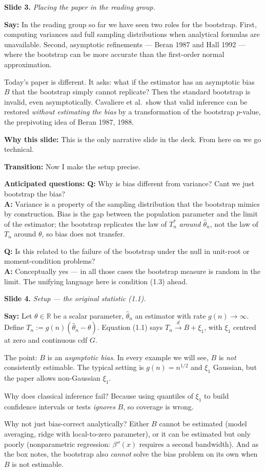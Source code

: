 \documentclass[11pt]{article}
\theoremstyle{definition}
\newcommand{\R}{\mathbb{R}}
\newcommand{\dto}{\xrightarrow{d}}
\newcommand{\Tn}{T_{n}}
\newcommand{\Tns}{T_{n}^{*}}
\newcommand{\thn}{\hat{\theta}_{n}}
\newcommand{\slide}[2]{%
  \medskip
  \noindent\colorbox{soft}{\parbox{\linewidth}{\textbf{Slide #1.} \textit{#2}}}
  \medskip
}
\newcommand{\say}[1]{\textbf{Say:} #1}
\newcommand{\why}[1]{\textbf{Why this slide:} #1}
\newcommand{\trans}[1]{\textbf{Transition:} #1}
\newcommand{\Q}[2]{\noindent\textcolor{warn}{\textbf{Q:}} #1\\ \textcolor{accent}{\textbf{A:}} #2\par\smallskip}
\begin{document}
\slide{3}{Placing the paper in the reading group.}
\say{In the reading group so far we have seen two roles for the bootstrap.
First, computing variances and full sampling distributions when analytical
formulas are unavailable. Second, asymptotic refinements --- Beran 1987 and
Hall 1992 --- where the bootstrap can be more accurate than the first-order
normal approximation.

Today's paper is different. It asks: what if the estimator has an asymptotic
bias $B$ that the bootstrap simply cannot replicate? Then the standard
bootstrap is invalid, even asymptotically. Cavaliere et al.\ show that valid
inference can be restored \emph{without estimating the bias} by a transformation
of the bootstrap $p$-value, the prepivoting idea of Beran 1987, 1988.}

\why{This is the only narrative slide in the deck. From here on we go technical.}

\trans{Now I make the setup precise.}

\textbf{Anticipated questions:}
\Q{Why is bias different from variance? Cant we just bootstrap the bias?}
{Variance is a property of the sampling distribution that the bootstrap
mimics by construction. Bias is the gap between the population parameter and
the limit of the estimator; the bootstrap replicates the law of $\Tns$ \emph{around
$\thn$}, not the law of $\Tn$ around $\theta$, so bias does not transfer.}
\Q{Is this related to the failure of the bootstrap under the null in
unit-root or moment-condition problems?}
{Conceptually yes --- in all those cases the bootstrap measure is random
in the limit. The unifying language here is condition (1.3) ahead.}

\slide{4}{Setup --- the original statistic (1.1).}
\say{Let $\theta\in\R$ be a scalar parameter, $\thn$ an estimator with rate
$g(n)\to\infty$. Define $\Tn:=g(n)(\thn-\theta)$. Equation (1.1) says
$\Tn\dto B+\xi_1$, with $\xi_1$ centred at zero and continuous cdf $G$.

The point: $B$ is an \emph{asymptotic bias}. In every example we will see, $B$
is \emph{not} consistently estimable. The typical setting is $g(n)=n^{1/2}$ and
$\xi_1$ Gaussian, but the paper allows non-Gaussian $\xi_1$.

Why does classical inference fail? Because using quantiles of $\xi_1$ to build
confidence intervals or tests \emph{ignores} $B$, so coverage is wrong.

Why not just bias-correct analytically? Either $B$ cannot be estimated (model
averaging, ridge with local-to-zero parameter), or it can be estimated but only
poorly (nonparametric regression: $\beta''(x)$ requires a second bandwidth).
And as the box notes, the bootstrap also \emph{cannot} solve the bias problem on
its own when $B$ is not estimable.}
\end{document}
